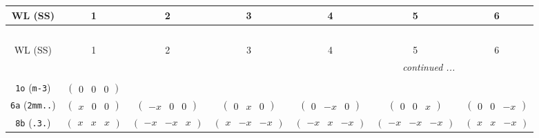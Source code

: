 \documentclass[fleqn,9pt,landscape]{jsarticle}
\begin{document}
\begin{center}
\renewcommand{\arraystretch}{1.2}
\begin{longtable}{ccccccc}
 \hline \hline
WL (SS) & 1 & 2 & 3 & 4 & 5 & 6 \\ \hline \endfirsthead

\multicolumn{6}{l}{\tablename\ \thetable{}} \\
 \hline \hline
WL (SS) & 1 & 2 & 3 & 4 & 5 & 6 \\ \hline \endhead

 \hline \hline
\multicolumn{6}{r}{\footnotesize\it continued ...} \\ \endfoot

 \hline \hline
\multicolumn{6}{r}{} \\ \endlastfoot

{\tt 1o} ({\tt m-3}) & $ \begin{pmatrix} 0 & 0 & 0 \end{pmatrix} $ & $  $ & $  $ & $  $ & $  $ & $  $ \\ \hline
{\tt 6a} ({\tt 2mm..}) & $ \begin{pmatrix} x & 0 & 0 \end{pmatrix} $ & $ \begin{pmatrix} - x & 0 & 0 \end{pmatrix} $ & $ \begin{pmatrix} 0 & x & 0 \end{pmatrix} $ & $ \begin{pmatrix} 0 & - x & 0 \end{pmatrix} $ & $ \begin{pmatrix} 0 & 0 & x \end{pmatrix} $ & $ \begin{pmatrix} 0 & 0 & - x \end{pmatrix} $ \\ \hline
{\tt 8b} ({\tt .3.}) & $ \begin{pmatrix} x & x & x \end{pmatrix} $ & $ \begin{pmatrix} - x & - x & x \end{pmatrix} $ & $ \begin{pmatrix} x & - x & - x \end{pmatrix} $ & $ \begin{pmatrix} - x & x & - x \end{pmatrix} $ & $ \begin{pmatrix} - x & - x & - x \end{pmatrix} $ & $ \begin{pmatrix} x & x & - x \end{pmatrix} $ \\

\end{longtable}
\end{center}
\end{document}
